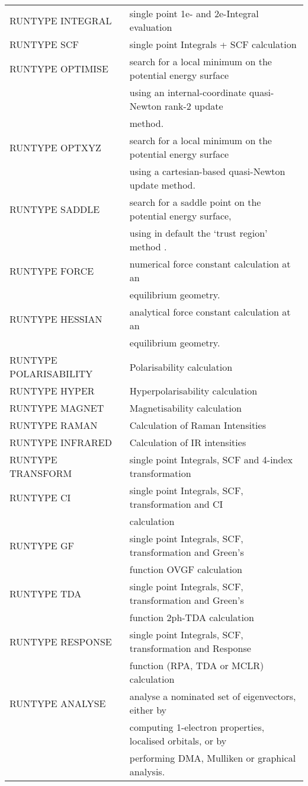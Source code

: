 \documentclass[11pt,fleqn]{article}
\begin{document}
\begin{tabular}{ll}
\\ \hline
RUNTYPE INTEGRAL & single point 1e- and 2e-Integral evaluation \\
RUNTYPE SCF      & single point Integrals + SCF calculation \\
RUNTYPE OPTIMISE & search for a local minimum on the potential energy surface \\
                 & using an internal-coordinate quasi-Newton rank-2 update \\
                 & method.\\
RUNTYPE OPTXYZ & search for a local minimum on the potential energy surface \\
                 & using a cartesian-based quasi-Newton update method.\\
RUNTYPE SADDLE   & search for a saddle point on the potential energy surface, \\
                 & using in default the `trust region' method \cite{cerjan}.\\
RUNTYPE FORCE    & numerical force constant calculation at an \\
                 & equilibrium geometry.\\
RUNTYPE HESSIAN  & analytical force constant calculation at an \\
                 & equilibrium geometry.\\
RUNTYPE POLARISABILITY & Polarisability calculation \\
RUNTYPE HYPER    & Hyperpolarisability calculation \\
RUNTYPE MAGNET   & Magnetisability calculation \\
RUNTYPE RAMAN    & Calculation of Raman Intensities\\
RUNTYPE INFRARED & Calculation of IR intensities \\
RUNTYPE TRANSFORM  & single point Integrals, SCF and 4-index transformation  \\
RUNTYPE CI       & single point Integrals, SCF, transformation and CI \\
                 & calculation \\
RUNTYPE GF       & single point Integrals, SCF, transformation and Green's  \\
                 & function OVGF  calculation \\
RUNTYPE TDA      & single point Integrals, SCF, transformation and Green's  \\
                 & function 2ph-TDA  calculation \\
RUNTYPE RESPONSE & single point Integrals, SCF, transformation and Response  \\
                 & function (RPA, TDA or MCLR)  calculation \\
RUNTYPE ANALYSE  & analyse a nominated set of eigenvectors, either by\\
                 & computing 1-electron properties, localised orbitals, or by \\
                 & performing DMA, Mulliken or graphical analysis.\\ \hline
\hline
\end{tabular}
\end{document}
